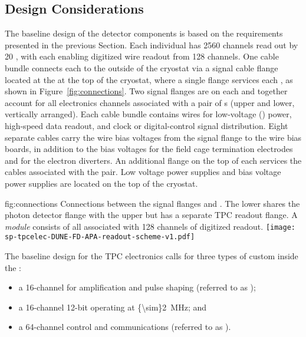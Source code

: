 \subsection{Design Considerations}
\label{sec:fdsp-tpcelec-overview-design}

The baseline design of the  detector components is
based on the requirements presented in the previous Section.
Each individual  has \num{2560} channels read out by \num{20} 
, with each  enabling digitized wire readout 
from \num{128} channels. One cable bundle connects each  to
the outside of the cryostat via a  signal cable flange located 
at the  \fdth at the top of the cryostat, where a single flange 
services each , as shown in Figure~\ref{fig:connections}. 
Two  signal flanges are on each \fdth and together account for 
all electronics channels associated with a pair of s (upper 
and lower, vertically arranged). Each cable bundle contains wires for 
low-voltage () power, high-speed data readout, and clock or 
digital-control signal distribution. Eight separate cables carry the 
 wire bias voltages from the signal flange to the  
wire bias boards, in addition to the bias voltages for the field cage 
termination electrodes and for the electron diverters. An additional 
flange on the top of each \fdth services the  cables associated 
with the  pair. Low voltage power supplies and bias voltage
power supplies are located on the top of the cryostat. 

\begin{dunefigure}
{fig:connections}
{Connections between the signal flanges and . The lower 
 shares the photon detector flange with the 
upper  but has a separate TPC readout flange. 
A \textit{ module} consists of all  
associated with \num{128} channels of digitized readout.}
\texttt{[image: sp-tpcelec-DUNE-FD-APA-readout-scheme-v1.pdf]}
\end{dunefigure}

The baseline design for the  TPC electronics calls for three 
types of custom  inside  the :
\begin{itemize}
\item{a \num{16}-channel   for amplification 
and pulse shaping (referred to as );}
\item{a \num{16}-channel \num{12}-bit   
operating at \SI{{\sim}2}{MHz}; and}
\item{a \num{64}-channel control and communications  
(referred to as ).}
\end{itemize}

